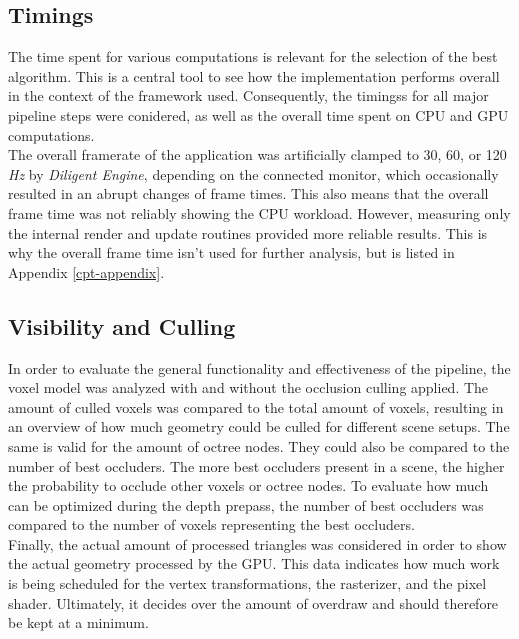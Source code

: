 \subsection*{Timings} \label{subsec-timings}

The time spent for various computations is relevant for the selection of the best algorithm. This is a central 
tool to see how the implementation performs overall in the context of the framework used. Consequently, the 
timingss for all major pipeline steps were conidered, as well as the overall time spent on \ac{CPU} and \ac{GPU} 
computations. \\

\noindent 
The overall framerate of the application was artificially clamped to 30, 60, or 120 \emph{Hz} by \emph{Diligent Engine}, 
depending on the connected monitor, which occasionally resulted in an abrupt changes of frame times. This also means 
that the overall frame time was not reliably showing the \ac{CPU} workload. However, measuring only the internal render 
and update routines provided more reliable results. This is why the overall frame time isn't used for further analysis, 
but is listed in Appendix \ref{cpt-appendix}.


\subsection*{Visibility and Culling} \label{subsec-visibility-and-culling}

In order to evaluate the general functionality and effectiveness of the pipeline, the voxel model was analyzed 
with and without the occlusion culling applied. The amount of culled voxels was compared to the total amount of 
voxels, resulting in an overview of how much geometry could be culled for different scene setups. The same is 
valid for the amount of octree nodes. They could also be compared to the number of best occluders. The more best 
occluders present in a scene, the higher the probability to occlude other voxels or octree nodes. To evaluate 
how much can be optimized during the depth prepass, the number of best occluders was compared to the number 
of voxels representing the best occluders. \\

\noindent
Finally, the actual amount of processed triangles was considered in order to show the actual geometry processed 
by the \ac{GPU}. This data indicates how much work is being scheduled for the vertex transformations, the rasterizer, 
and the pixel shader. Ultimately, it decides over the amount of overdraw and should therefore be kept at a minimum.



